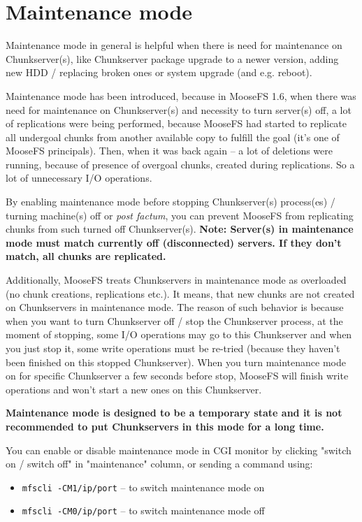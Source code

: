 \documentclass[a4paper,11pt,english]{report}
\def\code#1{\texttt{#1}}
\begin{document}
		\section{Maintenance mode}
		Maintenance mode in general is helpful when there is need for maintenance on Chunkserver(s), like Chunkserver package upgrade to a newer version, adding new HDD / replacing broken ones or system upgrade (and e.g. reboot).
		
		Maintenance mode has been introduced, because in MooseFS 1.6, when there was need for maintenance on Chunkserver(s) and necessity to turn server(s) off, a lot of replications were being performed, because MooseFS had started to replicate all undergoal chunks from another available copy to fulfill the goal (it's one of MooseFS principals). Then, when it was back again -- a lot of deletions were running, because of presence of overgoal chunks, created during replications. So a lot of unnecessary I/O operations.
		
		By enabling maintenance mode before stopping Chunkserver(s) process(es) / turning machine(s) off or \textit{post factum}, you can prevent MooseFS from replicating chunks from such turned off Chunkserver(s). \textbf{Note: Server(s) in maintenance mode must match currently off (disconnected) servers. If they don't match, all chunks are replicated.}
		
		Additionally, MooseFS treats Chunkservers in maintenance mode as overloaded (no chunk creations, replications etc.). It means, that new chunks are not created on Chunkservers in maintenance mode. The reason of such behavior is because when you want to turn Chunkserver off / stop the Chunkserver process, at the moment of stopping, some I/O operations may go to this Chunkserver and when you just stop it, some write operations must be re-tried (because they haven't been finished on this stopped Chunkserver). When you turn maintenance mode on for specific Chunkserver a few seconds before stop, MooseFS will finish write operations and won't start a new ones on this Chunkserver.
		
		\textbf{Maintenance mode is designed to be a temporary state and it is not recommended to put Chunkservers in this mode for a long time.}
		
		You can enable or disable maintenance mode in CGI monitor by clicking "switch on / switch off"
		in "maintenance" column, or sending a command using:
		\begin{itemize}
			\item \code{mfscli -CM1/ip/port} -- to switch maintenance mode on
			\item \code{mfscli -CM0/ip/port} -- to switch maintenance mode off
		\end{itemize}
\end{document}
